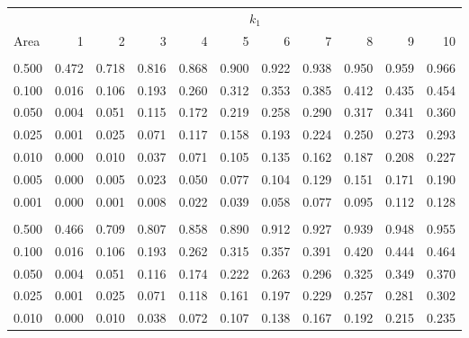 \documentclass[
]{article}
\begin{document}
\begin{longtable}[t]{lrrrrrrrrrr}
\toprule
\multicolumn{1}{c}{ } & \multicolumn{10}{c}{$k_1$} \\
\cmidrule(l{3pt}r{3pt}){2-11}
Area & 1 & 2 & 3 & 4 & 5 & 6 & 7 & 8 & 9 & 10\\
\midrule
\addlinespace[0.3em]
\multicolumn{11}{l}{\textbf{$k_2=20$}}\\
\hspace{1em}0.500 & 0.472 & 0.718 & 0.816 & 0.868 & 0.900 & 0.922 & 0.938 & 0.950 & 0.959 & 0.966\\
\hspace{1em}0.100 & 0.016 & 0.106 & 0.193 & 0.260 & 0.312 & 0.353 & 0.385 & 0.412 & 0.435 & 0.454\\
\hspace{1em}0.050 & 0.004 & 0.051 & 0.115 & 0.172 & 0.219 & 0.258 & 0.290 & 0.317 & 0.341 & 0.360\\
\hspace{1em}0.025 & 0.001 & 0.025 & 0.071 & 0.117 & 0.158 & 0.193 & 0.224 & 0.250 & 0.273 & 0.293\\
\hspace{1em}0.010 & 0.000 & 0.010 & 0.037 & 0.071 & 0.105 & 0.135 & 0.162 & 0.187 & 0.208 & 0.227\\
\hspace{1em}0.005 & 0.000 & 0.005 & 0.023 & 0.050 & 0.077 & 0.104 & 0.129 & 0.151 & 0.171 & 0.190\\
\hspace{1em}0.001 & 0.000 & 0.001 & 0.008 & 0.022 & 0.039 & 0.058 & 0.077 & 0.095 & 0.112 & 0.128\\
\addlinespace[0.3em]
\multicolumn{11}{l}{\textbf{$k_2=30$}}\\
\hspace{1em}0.500 & 0.466 & 0.709 & 0.807 & 0.858 & 0.890 & 0.912 & 0.927 & 0.939 & 0.948 & 0.955\\
\hspace{1em}0.100 & 0.016 & 0.106 & 0.193 & 0.262 & 0.315 & 0.357 & 0.391 & 0.420 & 0.444 & 0.464\\
\hspace{1em}0.050 & 0.004 & 0.051 & 0.116 & 0.174 & 0.222 & 0.263 & 0.296 & 0.325 & 0.349 & 0.370\\
\hspace{1em}0.025 & 0.001 & 0.025 & 0.071 & 0.118 & 0.161 & 0.197 & 0.229 & 0.257 & 0.281 & 0.302\\
\hspace{1em}0.010 & 0.000 & 0.010 & 0.038 & 0.072 & 0.107 & 0.138 & 0.167 & 0.192 & 0.215 & 0.235\\

\end{longtable}
\end{document}

